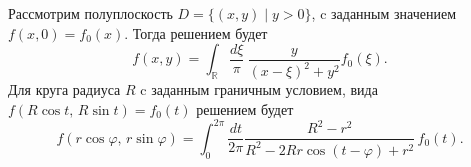 Рассмотрим полуплоскость $D= \{(x,y) \mid y > 0\}$, c заданным значением $f(x, 0) = f_0(x)$. Тогда решением будет
\begin{equation}
    f(x, y) = \int_{\mathbb{R}} \frac{d\xi}{\pi}\ \frac{y}{(x-\xi)^2 + y^2} f_0 (\xi).
\end{equation}
Для круга радиуса $R$ c заданным граничным условием, вида $f(R \cos t,\, R \sin t) = f_0 (t)$ решением будет
\begin{equation}
    f(r \cos \varphi,\, r \sin \varphi) = 
    \int_{0}^{2\pi} \frac{dt}{2\pi}
    \frac{R^2-r^2}{R^2 - 2 R r \cos(t-\varphi) + r^2} \, f_0 (t).
\end{equation}



